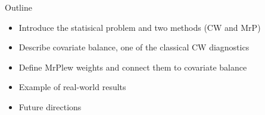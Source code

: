 

\begin{frame}{Outline}
%
\begin{itemize}
    \item Introduce the statisical problem and two methods (CW and MrP)
    \item Describe covariate balance, one of the classical CW diagnostics
    \item Define MrPlew weights and connect them to covariate balance
    \item Example of real-world results
    \item Future directions
\end{itemize}
%
\end{frame}
